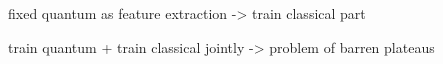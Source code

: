 fixed quantum as feature extraction -> train classical part

train quantum + train classical jointly -> problem of barren plateaus

